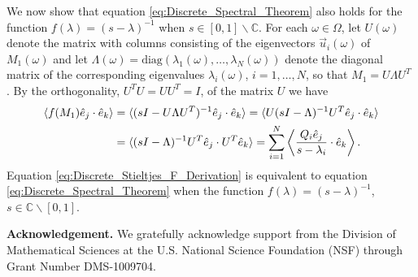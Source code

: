 \documentclass{cmslatex}
\begin{document}
We now show that equation \eqref{eq:Discrete_Spectral_Theorem} also
holds for the function $f(\lambda)=(s-\lambda)^{-1}$ when
$s\in[0,1]\backslash\mathbb{C}$. For each $\omega\in\Omega$, let $U(\omega)$ denote the matrix
with columns consisting of the eigenvectors $\vec{u}_i(\omega)$ of $M_1(\omega)$
and let $\Lambda(\omega)=\text{diag}(\lambda_1(\omega),\ldots,\lambda_N(\omega))$ denote the diagonal matrix
of the corresponding eigenvalues $\lambda_i(\omega)$, $i=1,\ldots,N$, so that
$M_1=U\Lambda U^T$ \cite{Halmos-1958}. By the orthogonality, $U^TU=UU^T=I$,
of the matrix $U$ we have   
%
\begin{align}\label{eq:Discrete_Stieltjes_F_Derivation}
     \langle f(M_1)\hat{e}_j\cdot\hat{e}_k\rangle
        &=\langle(sI-U\Lambda U^T)^{-1}\hat{e}_j\cdot\hat{e}_k\rangle
        = \langle U(sI-\Lambda)^{-1}U^T\hat{e}_j\cdot\hat{e}_k\rangle\\
        &=\langle(sI-\Lambda)^{-1}U^T\hat{e}_j\cdot U^T\hat{e}_k\rangle
        =\sum_{i=1}^N\left\langle
          \frac{Q_i\hat{e}_j}{s-\lambda_i}\cdot\hat{e}_k
          \right\rangle.               
        \notag
\end{align}
%
Equation \eqref{eq:Discrete_Stieltjes_F_Derivation} is equivalent to equation
\eqref{eq:Discrete_Spectral_Theorem} when the function
$f(\lambda)=(s-\lambda)^{-1}$, $s\in\mathbb{C}\backslash[0,1]$.





\medskip

{\bf Acknowledgement.}
We gratefully acknowledge support from the Division of Mathematical
Sciences at the U.S. National Science Foundation (NSF) through Grant
Number DMS-1009704.

\medskip



\end{document}
